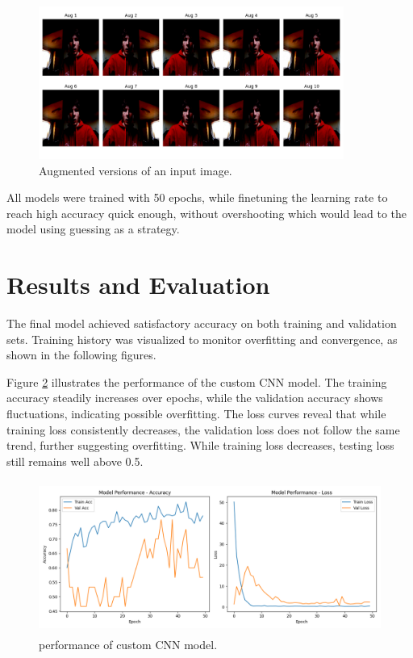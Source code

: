 \documentclass{report}
\begin{document}
\begin{figure}[H]
    \centering
    \includegraphics[height=50mm, keepaspectratio]{report_images/transfer_preprocess.png}
    \caption{Augmented versions of an input image.}
    \label{fig:transfer_preprocess}
\end{figure}

All models were trained with 50 epochs, while finetuning the learning rate to reach high accuracy quick enough, without overshooting which would lead to the model using guessing as a strategy.

\section{Results and Evaluation}
The final model achieved satisfactory accuracy on both training and validation sets. Training history was visualized to monitor overfitting and convergence, as shown in the following figures.

Figure \ref{fig:raw} illustrates the performance of the custom CNN model. The training accuracy steadily increases over epochs, while the validation accuracy shows fluctuations, indicating possible overfitting. The loss curves reveal that while training loss consistently decreases, the validation loss does not follow the same trend, further suggesting overfitting. While training loss decreases, testing loss still remains well above 0.5.

\begin{figure}[H]
    \centering
    \includegraphics[height=50mm, keepaspectratio]{report_images/raw_performance.png}
    \caption{performance of custom CNN model.}
    \label{fig:raw}
\end{figure}
\end{document}

